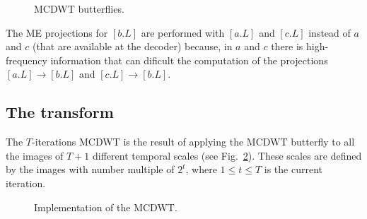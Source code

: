 \begin{figure}
  \centering {}
  
  
  
  \caption{MCDWT butterflies.}
  \label{fig:forward_butterfly}
\end{figure}

The ME projections for $[b.L]$ are performed with $[a.L]$ and $[c.L]$
instead of $a$ and $c$ (that are available at the decoder) because, in
$a$ and $c$ there is high-frequency information that can dificult the
computation of the projections $[a.L]\rightarrow [b.L]$ and
$[c.L]\rightarrow [b.L]$.



\subsection{The transform}
The $T$-iterations MCDWT is the result of applying the MCDWT butterfly
to all the images of $T+1$ different temporal scales (see
Fig.~\ref{fig:MCDWT}). These scales are defined by the images with
number multiple of $2^t$, where $1\leq t\leq T$ is the current
iteration.

\begin{figure}
  \centering
  
  
  \caption{Implementation of the MCDWT.}
  \label{fig:MCDWT}
\end{figure}

